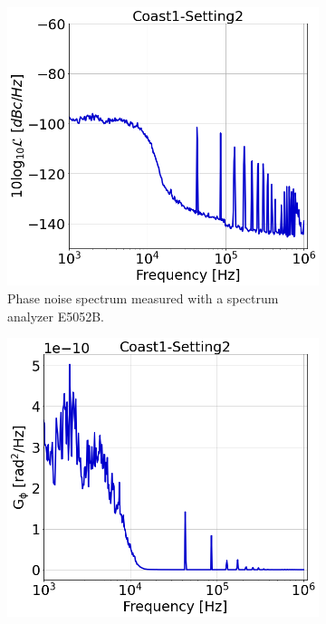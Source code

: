 \begin{figure}[!ht]
    \centering
    \begin{subfigure}[t]{0.42\textwidth}
        \centering
        \includegraphics[width=1\textwidth]{./images/app_B/coast1_setting2_v1.png}
        \caption{Phase noise spectrum measured with a spectrum analyzer E5052B.}
        \label{fig:coast1_setting2_a}
    \end{subfigure}
    \hfill
    \begin{subfigure}[t]{0.42\textwidth}
        \centering
        \includegraphics[width=1 \textwidth]{./images/app_B/coast1_setting2_Gyy.png}

\end{subfigure}
\end{figure}
